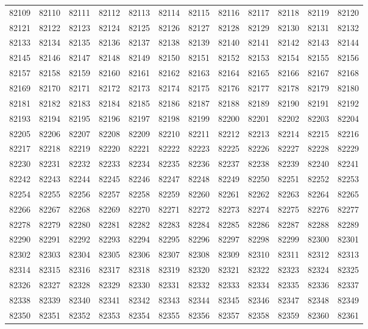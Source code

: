 \begin{center}
\begin{longtable}{llllllllllll}
82109 &82110 &82111 &82112 &82113 &82114 &82115 &82116 &82117 &82118 &82119 &82120 \\
82121 &82122 &82123 &82124 &82125 &82126 &82127 &82128 &82129 &82130 &82131 &82132 \\
82133 &82134 &82135 &82136 &82137 &82138 &82139 &82140 &82141 &82142 &82143 &82144 \\
82145 &82146 &82147 &82148 &82149 &82150 &82151 &82152 &82153 &82154 &82155 &82156 \\
82157 &82158 &82159 &82160 &82161 &82162 &82163 &82164 &82165 &82166 &82167 &82168 \\
82169 &82170 &82171 &82172 &82173 &82174 &82175 &82176 &82177 &82178 &82179 &82180 \\
82181 &82182 &82183 &82184 &82185 &82186 &82187 &82188 &82189 &82190 &82191 &82192 \\
82193 &82194 &82195 &82196 &82197 &82198 &82199 &82200 &82201 &82202 &82203 &82204 \\
82205 &82206 &82207 &82208 &82209 &82210 &82211 &82212 &82213 &82214 &82215 &82216 \\
82217 &82218 &82219 &82220 &82221 &82222 &82223 &82225 &82226 &82227 &82228 &82229 \\
82230 &82231 &82232 &82233 &82234 &82235 &82236 &82237 &82238 &82239 &82240 &82241 \\
82242 &82243 &82244 &82245 &82246 &82247 &82248 &82249 &82250 &82251 &82252 &82253 \\
82254 &82255 &82256 &82257 &82258 &82259 &82260 &82261 &82262 &82263 &82264 &82265 \\
82266 &82267 &82268 &82269 &82270 &82271 &82272 &82273 &82274 &82275 &82276 &82277 \\
82278 &82279 &82280 &82281 &82282 &82283 &82284 &82285 &82286 &82287 &82288 &82289 \\
82290 &82291 &82292 &82293 &82294 &82295 &82296 &82297 &82298 &82299 &82300 &82301 \\
82302 &82303 &82304 &82305 &82306 &82307 &82308 &82309 &82310 &82311 &82312 &82313 \\
82314 &82315 &82316 &82317 &82318 &82319 &82320 &82321 &82322 &82323 &82324 &82325 \\
82326 &82327 &82328 &82329 &82330 &82331 &82332 &82333 &82334 &82335 &82336 &82337 \\
82338 &82339 &82340 &82341 &82342 &82343 &82344 &82345 &82346 &82347 &82348 &82349 \\
82350 &82351 &82352 &82353 &82354 &82355 &82356 &82357 &82358 &82359 &82360 &82361 \\

\end{longtable}
\end{center}
